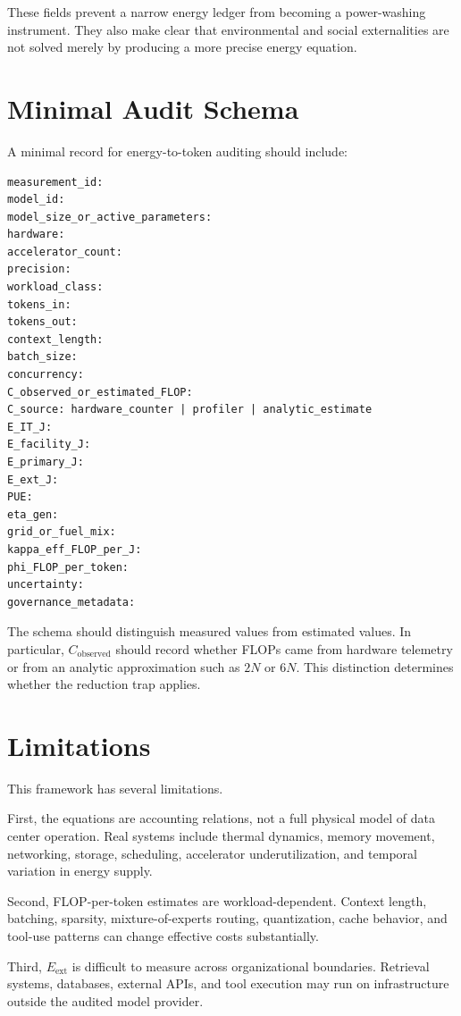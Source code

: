 \documentclass[11pt]{article}
\begin{document}
These fields prevent a narrow energy ledger from becoming a power-washing instrument. They also make clear that environmental and social externalities are not solved merely by producing a more precise energy equation.

\section{Minimal Audit Schema}

A minimal record for energy-to-token auditing should include:

\begin{verbatim}
measurement_id:
model_id:
model_size_or_active_parameters:
hardware:
accelerator_count:
precision:
workload_class:
tokens_in:
tokens_out:
context_length:
batch_size:
concurrency:
C_observed_or_estimated_FLOP:
C_source: hardware_counter | profiler | analytic_estimate
E_IT_J:
E_facility_J:
E_primary_J:
E_ext_J:
PUE:
eta_gen:
grid_or_fuel_mix:
kappa_eff_FLOP_per_J:
phi_FLOP_per_token:
uncertainty:
governance_metadata:
\end{verbatim}

The schema should distinguish measured values from estimated values. In particular, \(C_{\mathrm{observed}}\) should record whether FLOPs came from hardware telemetry or from an analytic approximation such as \(2N\) or \(6N\). This distinction determines whether the reduction trap applies.

\section{Limitations}

This framework has several limitations.

First, the equations are accounting relations, not a full physical model of data center operation. Real systems include thermal dynamics, memory movement, networking, storage, scheduling, accelerator underutilization, and temporal variation in energy supply.

Second, FLOP-per-token estimates are workload-dependent. Context length, batching, sparsity, mixture-of-experts routing, quantization, cache behavior, and tool-use patterns can change effective costs substantially.

Third, \(E_{\mathrm{ext}}\) is difficult to measure across organizational boundaries. Retrieval systems, databases, external APIs, and tool execution may run on infrastructure outside the audited model provider.
\end{document}
